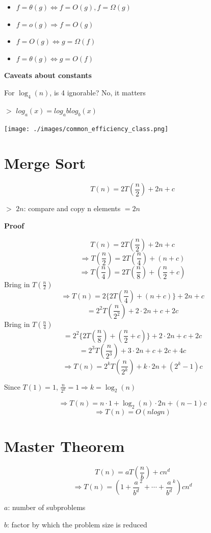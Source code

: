 \documentclass[12pt,a4paper]{article}
\newcommand{\remark}[1]{
    $>$ {\color{blue} #1}
}
\begin{document}
\begin{itemize}
    \item $f = \theta(g) \iff f = O(g),f = \Omega(g)$
    \item $f = o(g) \Rightarrow f = O(g)$
    \item $f = O(g) \iff g = \Omega(f)$
    \item $f = \theta(g) \iff g = O(f)$
\end{itemize}

\textbf{Caveats about constants}

For $\log_4(n)$, is 4 ignorable? No, it matters

\remark{$log_a(x) = log_a blog_b(x)$}

\texttt{[image: ./images/common\_efficiency\_class.png]}

\section*{Merge Sort}

\[T(n) = 2T(\frac{n}{2}) + 2n + c\]

\remark{$2n$: compare and copy n elements $= 2n$}

\textbf{Proof}

\[T(n) = 2T(\frac{n}{2}) + 2n + c\]
\[\Rightarrow T(\frac{n}{2}) = 2T(\frac{n}{4}) + (n + c)\]
\[\Rightarrow T(\frac{n}{4}) = 2T(\frac{n}{8}) + (\frac{n}{2} + c)\] Bring in $T(\frac{n}{2})$
\[\Rightarrow T(n) = 2\{2T(\frac{n}{4}) + (n + c)\} + 2n + c\]
\[= 2^2T(\frac{n}{2^2}) + 2 \cdot 2n + c + 2c\] Bring in $T(\frac{n}{4})$
\[= 2^2\{2T(\frac{n}{8}) + (\frac{n}{2} + c)\} + 2 \cdot 2n + c + 2c\]
\[= 2^3T(\frac{n}{2^3}) + 3 \cdot 2n + c + 2c + 4c\]
\[\Rightarrow T(n)= 2^kT(\frac{n}{2^k}) + k \cdot 2n + (2^k-1)c\]

Since $T(1) = 1$, $\frac{n}{2^k} = 1 \Rightarrow k = \log_2(n)$

\[\Rightarrow T(n) = n \cdot 1 + \log_2(n) \cdot 2n + (n-1)c\]
\[\Rightarrow T(n) = O(nlogn) \]

\section*{Master Theorem}

\[T(n) = aT(\frac{n}{b}) + cn^d\]
\[\Rightarrow T(n) = (1 + \frac{a}{b^d}^2 + \cdots + \frac{a}{b^d}^k)cn^d\]

$a$: number of subproblems

$b$: factor by which the problem size is reduced
\end{document}
